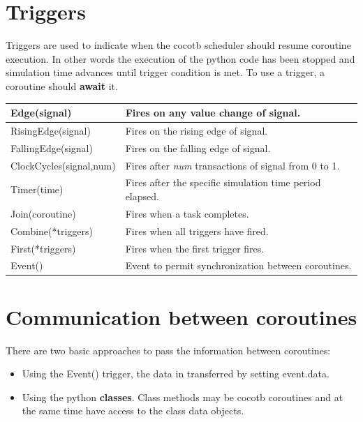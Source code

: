 \documentclass[aspectratio=169]{beamer}
\begin{document}
\section*{Triggers}
\begin{frame}{\secname}
  Triggers are used to indicate when the cocotb scheduler should resume coroutine execution. In other words the execution of the python code has been stopped and simulation time advances until trigger condition is met. To use a trigger, a coroutine should {\bf await} it. 

  \centering
  \begin{tabular}{l|l}
    Edge(signal) & Fires on any value change of signal. \\ \hline
    RisingEdge(signal) & Fires on the rising edge of signal.\\ \hline
    FallingEdge(signal) & Fires on the falling edge of signal. \\ \hline
    ClockCycles(signal,num) & Fires after {\it num} transactions of signal from 0 to 1.\\ \hline
    Timer(time) & Fires after the specific simulation time period elapsed. \\ \hline\hline
    Join(coroutine) & Fires when a task completes. \\ \hline
    Combine(*triggers) & Fires when all triggers have fired. \\ \hline
    First(*triggers)   & Fires when the first trigger fires. \\ \hline
    Event()            & Event to permit synchronization between coroutines.
  \end{tabular}
    
\end{frame}

\section*{Communication between coroutines}
\begin{frame}[fragile]{\secname}
  There are two basic approaches to pass the information between coroutines: 
  \begin{itemize}
    \item Using the Event() trigger, the data in transferred by setting event.data.
    \item Using the python {\bf classes}. Class methods may be cocotb coroutines and
      at the same time have access to the class data objects. 
  \end{itemize}
  
    
\end{frame}
\end{document}
